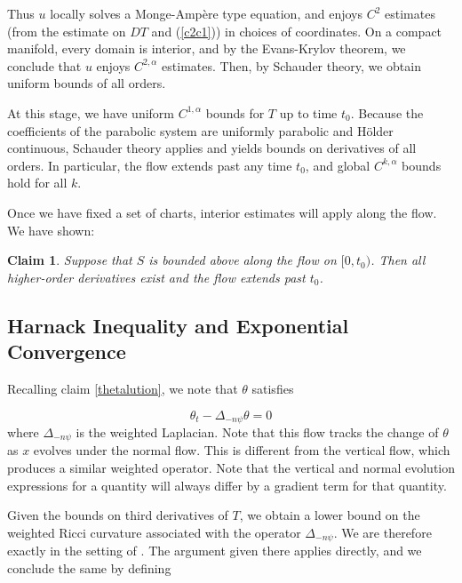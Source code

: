 \documentclass[12pt,letterpaper]{amsart}%
\newcounter{mycounter}
\numberwithin{mycounter}{section}
\theoremstyle{plain}
\newtheorem{claim}[mycounter]{Claim}
\numberwithin{equation}{section}
\theoremstyle{definition}
\begin{document}
Thus $u$ locally solves a Monge-Amp\`{e}re type equation, and enjoys $C^{2}$
estimates (from the estimate on $DT$ and (\ref{c2c1})) in choices of coordinates. On a compact manifold, every domain is
interior, and by the Evans-Krylov theorem, we conclude that $u$ enjoys $C^{2,\alpha}$
estimates. Then, by Schauder theory, we obtain uniform bounds of
all orders.



At this stage, we have uniform $C^{1,\alpha}$ bounds for $T$ up to time $t_{0}$. 
Because the coefficients of the parabolic system are uniformly parabolic and H\"older continuous, Schauder theory applies and yields bounds on derivatives of all orders. In particular, the flow extends past any time $t_{0}$, and global $C^{k,\alpha}$ bounds hold for all $k$.

Once we have fixed a set of charts, interior estimates will apply along the flow. 
We have shown:
\begin{claim}
Suppose that $S$ is bounded above along the flow on $[0,t_0)$.  Then all higher-order derivatives exist and the flow extends past $t_0$.
\end{claim}






\subsection{Harnack Inequality and Exponential Convergence} 

Recalling claim \ref{thetalution}, we note that $\theta$ satisfies 


$$\theta_t -\Delta_{-n\psi} \theta=0$$
where $\Delta_{-n\psi}$ is the weighted Laplacian.   Note that this flow tracks the change of $\theta$ as $x$ evolves under the normal flow. This is different from the vertical flow, which produces a similar weighted operator. Note that the vertical and normal evolution expressions for a quantity will always differ by a gradient term for that quantity.



Given the bounds on third derivatives of $T$, we obtain a lower bound on the weighted Ricci curvature associated with the operator $\Delta_{-n\psi}$. We are therefore exactly in the setting of \cite[Prop.~2.7]{AK}. The argument given there applies directly, and we conclude the same by defining
\end{document}
